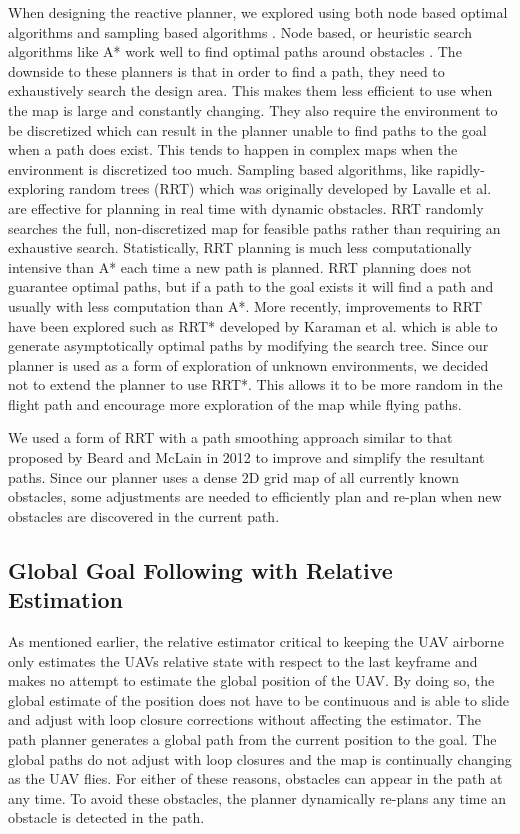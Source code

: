 \documentclass[letterpaper, 10 pt, conference]{ieeeconf}  %
\begin{document}
When designing the reactive planner, we explored using both node based optimal algorithms and sampling based algorithms \cite{Yang2016}. Node based, or heuristic search algorithms like A* work well to find optimal paths around obstacles \cite{Nilsson2011}. The downside to these planners is that in order to find a path, they need to exhaustively search the design area. This makes them less efficient to use when the map is large and constantly changing. They also require the environment to be discretized which can result in the planner unable to find paths to the goal when a path does exist. This tends to happen in complex maps when the environment is discretized too much. Sampling based algorithms, like rapidly-exploring random trees (RRT) which was originally developed by Lavalle et al. \cite{Lavalle1998} are effective for planning in real time with dynamic obstacles. RRT randomly searches the full, non-discretized map for feasible paths rather than requiring an exhaustive search. Statistically, RRT planning is much less computationally intensive than A* each time a new path is planned. RRT planning does not guarantee optimal paths, but if a path to the goal exists it will find a path and usually with less computation than A*. More recently, improvements to RRT have been explored such as RRT* developed by Karaman et al. \cite{Karaman2011} which is able to generate asymptotically optimal paths by modifying the search tree. Since our planner is used as a form of exploration of unknown environments, we decided not to extend the planner to use RRT*. This allows it to be more random in the flight path and encourage more exploration of the map while flying paths.

We used a form of RRT with a path smoothing approach similar to that proposed by Beard and McLain in 2012 \cite{Beard2012} to improve and simplify the resultant paths. Since our planner uses a dense 2D grid map of all currently known obstacles, some adjustments are needed to efficiently plan and re-plan when new obstacles are discovered in the current path.

\subsection{Global Goal Following with Relative Estimation}

As mentioned earlier, the relative estimator critical to keeping the UAV airborne only estimates the UAVs relative state with respect to the last keyframe and makes no attempt to estimate the global position of the UAV. By doing so, the global estimate of the position does not have to be continuous and is able to slide and adjust with loop closure corrections without affecting the estimator. The path planner generates a global path from the current position to the goal. The global paths do not adjust with loop closures and the map is continually changing as the UAV flies. For either of these reasons, obstacles can appear in the path at any time. To avoid these obstacles, the planner dynamically re-plans any time an obstacle is detected in the path.
\end{document}
